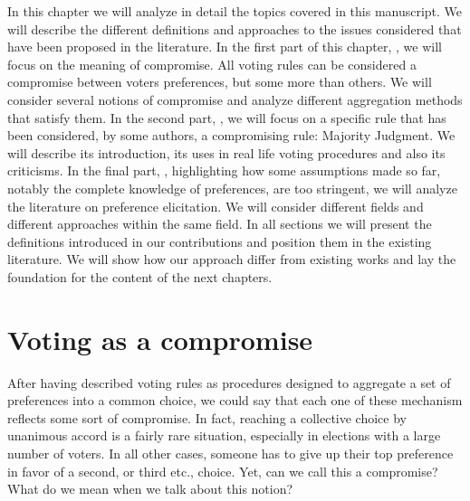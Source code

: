 
In this chapter we will analyze in detail the topics covered in this manuscript. We will describe the different definitions and approaches to the issues considered that have been proposed in the literature. 
In the first part of this chapter, , we will focus on the meaning of compromise. All voting rules can be considered a compromise between voters preferences, but some more than others. We will consider several notions of compromise and analyze different aggregation methods that satisfy them. 
In the second part, , we will focus on a specific rule that has been considered, by some authors, a compromising rule: Majority Judgment. We will describe its introduction, its uses in real life voting procedures and also its criticisms.
In the final part, , highlighting how some assumptions made so far, notably the complete knowledge of preferences, are too stringent, we will analyze the literature on preference elicitation. We will consider different fields and different approaches within the same field.
In all sections we will present the definitions introduced in our contributions and position them in the existing literature. We will show how our approach differ from existing works and lay the foundation for the content of the next chapters.


\section{Voting as a compromise}
\label{sec:litCMP}

After having described voting rules as procedures designed to aggregate a set of preferences into a common choice, we could say that each one of these mechanism reflects some sort of compromise. In fact, reaching a collective choice by unanimous accord is a fairly rare situation, especially in elections with a large number of voters. In all other cases, someone has to give up their top preference in favor of a second, or third etc., choice. Yet, can we call this a compromise? What do we mean when we talk about this notion?
